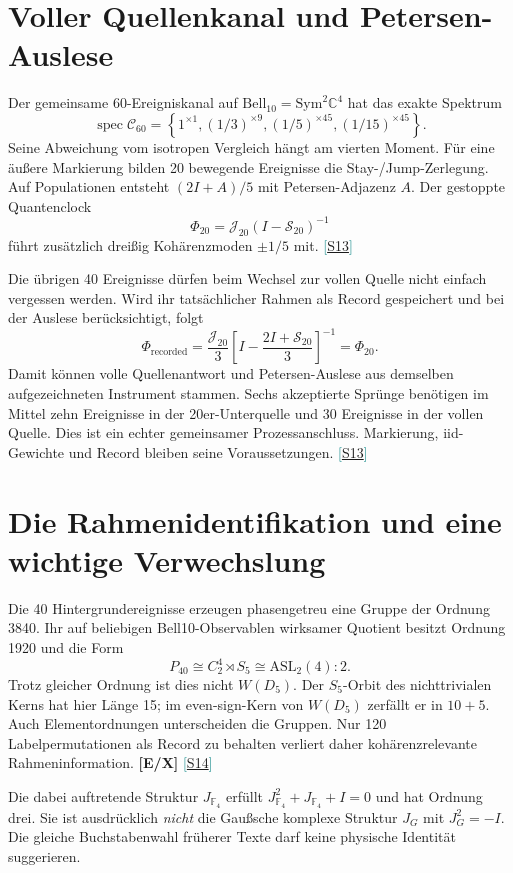 \documentclass[11pt,a4paper,oneside,parskip=half,headings=normal,numbers=noenddot,bibliography=totoc]{scrreprt}
\newcommand{\C}{\mathbb C}
\newcommand{\F}{\mathbb F}
\newcommand{\spec}{\operatorname{spec}}
\newcommand{\src}[1]{\textcolor{teal}{\small[\hyperref[s:#1]{S#1}]}}
\newcommand{\st}[1]{\textsf{\textbf{[#1]}}}
\begin{document}
\section{Voller Quellenkanal und Petersen-Auslese}
Der gemeinsame 60-Ereigniskanal auf $\mathrm{Bell}_{10}=\mathrm{Sym}^2\C^4$ hat das exakte Spektrum
\[
 \spec\mathcal C_{60}=\left\{1^{\times1},
 (1/3)^{\times9},(1/5)^{\times45},(1/15)^{\times45}\right\}.
\]
Seine Abweichung vom isotropen Vergleich hängt am vierten Moment. Für eine äußere Markierung bilden 20 bewegende Ereignisse die Stay-/Jump-Zerlegung. Auf Populationen entsteht $(2I+A)/5$ mit Petersen-Adjazenz $A$. Der gestoppte Quantenclock
\[
 \Phi_{20}=\mathcal J_{20}(I-\mathcal S_{20})^{-1}
\]
führt zusätzlich dreißig Kohärenzmoden $\pm1/5$ mit. \src{13}

Die übrigen 40 Ereignisse dürfen beim Wechsel zur vollen Quelle nicht einfach vergessen werden. Wird ihr tatsächlicher Rahmen als Record gespeichert und bei der Auslese berücksichtigt, folgt
\[
 \Phi_{\mathrm{recorded}}=
 \frac{\mathcal J_{20}}3
 \left[I-\frac{2I+\mathcal S_{20}}3\right]^{-1}
 =\Phi_{20}.
\]
Damit können volle Quellenantwort und Petersen-Auslese aus demselben aufgezeichneten Instrument stammen. Sechs akzeptierte Sprünge benötigen im Mittel zehn Ereignisse in der 20er-Unterquelle und 30 Ereignisse in der vollen Quelle. Dies ist ein echter gemeinsamer Prozessanschluss. Markierung, iid-Gewichte und Record bleiben seine Voraussetzungen. \src{13}

\section{Die Rahmenidentifikation und eine wichtige Verwechslung}
Die 40 Hintergrundereignisse erzeugen phasengetreu eine Gruppe der Ordnung 3840. Ihr auf beliebigen Bell10-Observablen wirksamer Quotient besitzt Ordnung 1920 und die Form
\[
 P_{40}\cong C_2^4\rtimes S_5\cong\mathrm{ASL}_2(4):2.
\]
Trotz gleicher Ordnung ist dies nicht $W(D_5)$. Der $S_5$-Orbit des nichttrivialen Kerns hat hier Länge 15; im even-sign-Kern von $W(D_5)$ zerfällt er in $10+5$. Auch Elementordnungen unterscheiden die Gruppen. Nur 120 Labelpermutationen als Record zu behalten verliert daher kohärenzrelevante Rahmeninformation. \st{E/X} \src{14}

Die dabei auftretende Struktur $J_{\F_4}$ erfüllt $J_{\F_4}^2+J_{\F_4}+I=0$ und hat Ordnung drei. Sie ist ausdrücklich \emph{nicht} die Gaußsche komplexe Struktur $J_G$ mit $J_G^2=-I$. Die gleiche Buchstabenwahl früherer Texte darf keine physische Identität suggerieren.
\end{document}
